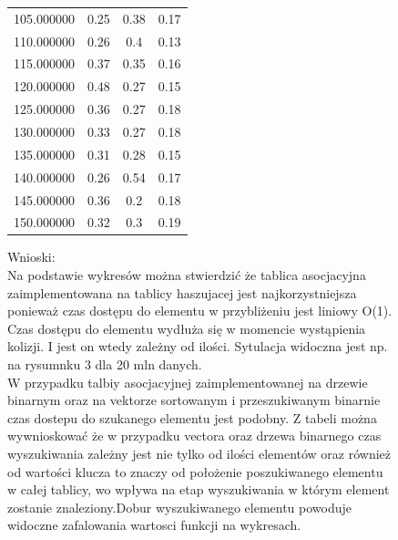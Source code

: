 \documentclass[a4paper,11pt]{report}
\begin{document}
\begin{figure}
\begin{tabular}{|l|c|c|r|}
105.000000&	0.25&	0.38&	0.17\\
110.000000&	0.26&	0.4&	0.13\\
115.000000&	0.37&	0.35&	0.16\\
120.000000&	0.48&	0.27&	0.15\\
125.000000&	0.36&	0.27&	0.18\\
130.000000&	0.33&	0.27&	0.18\\
135.000000&	0.31&	0.28&	0.15\\
140.000000&	0.26&	0.54&	0.17\\
145.000000&	0.36&	0.2&	0.18\\
150.000000&	0.32&	0.3&	0.19\\\hline

\hline
\end{tabular}
\end{figure}
 

\begin{figure}

Wnioski:\\
Na podstawie wykresów można stwierdzić że tablica asocjacyjna zaimplementowana na tablicy haszujacej jest najkorzystniejsza ponieważ czas dostępu do elementu w przybliżeniu jest liniowy O(1). Czas dostępu do elementu wydłuża się w momencie wystąpienia kolizji. I jest on wtedy zależny od ilości. Sytulacja widoczna jest np. na rysumnku 3 dla 20 mln danych.   
\\W przypadku talbiy asocjacyjnej zaimplementowanej na drzewie binarnym oraz na vektorze sortowanym i przeszukiwanym binarnie czas dostepu do szukanego elementu jest podobny. 
Z tabeli można wywnioskować że w przypadku vectora oraz drzewa binarnego czas wyszukiwania zależny jest nie tylko od ilości elementów oraz również od wartości klucza to znaczy od położenie poszukiwanego elementu w całej tablicy, wo wpływa na etap wyszukiwania w którym element zostanie znaleziony.Dobur wyszukiwanego elementu powoduje widoczne zafalowania wartosci funkcji na wykresach. 
\end{figure}
\end{document}
